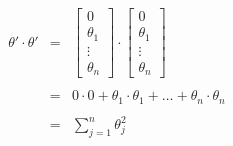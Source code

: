 $$
\begin{matrix}
\theta' \cdot \theta' & = & 
\begin{bmatrix}
  0 \\
  \theta_1 \\
  \vdots \\
  \theta_n
\end{bmatrix} \cdot \begin{bmatrix}
  0 \\
  \theta_1 \\
  \vdots \\
  \theta_n
\end{bmatrix} \\ 
\\
& = & 0 \cdot 0 + \theta_1 \cdot \theta_1 + \dots + \theta_n \cdot \theta_n \\ 
\\
& = & \sum_{j= 1}^n \theta_j^2
\end{matrix}
$$
